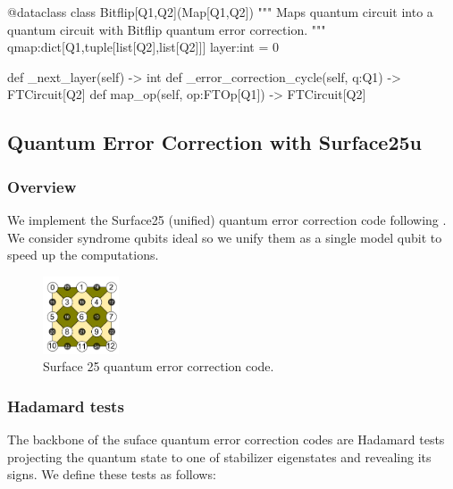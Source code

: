   \begin{python}
  @dataclass
  class Bitflip[Q1,Q2](Map[Q1,Q2])
    """ Maps quantum circuit into a quantum circuit with Bitflip quantum error correction. """
    qmap:dict[Q1,tuple[list[Q2],list[Q2]]]
    layer:int = 0

    def _next_layer(self) -> int
    def _error_correction_cycle(self, q:Q1) -> FTCircuit[Q2]
    def map_op(self, op:FTOp[Q1]) -> FTCircuit[Q2]
  \end{python}

\subsection{Quantum Error Correction with Surface25u}

\subsubsection{Overview}

We implement the Surface25 (unified) quantum error correction code following \cite{Tomita2014}.  We
consider syndrome qubits ideal so we unify them as a single model qubit to speed up the
computations.

\begin{figure}[h!]
  \centering
  \includegraphics[width=0.2\textwidth]{../img/surface25.png}
  \caption{Surface 25 quantum error correction code.}
  \label{fig:surface25}
\end{figure}


\subsubsection{Hadamard tests}

The backbone of the suface quantum error correction codes are Hadamard tests projecting the quantum
state to one of stabilizer eigenstates and revealing its signs. We define these tests as follows:

